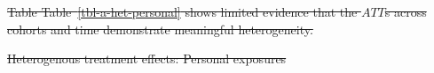 \documentclass[
  letterpaper,
  DIV=11,
  numbers=noendperiod]{scrartcl}
\makeatletter
\renewenvironment{table}%
   {\renewcommand\familydefault\sfdefault
    \@float{table}}
   {\end@float}
\providecommand{\DIFdeltex}[1]{{\protect\color{red}\sout{#1}}}                      %
\providecommand{\DIFdelFL}[1]{\DIFdel{#1}} %
\providecommand{\DIFdel}[1]{\texorpdfstring{\DIFdeltex{#1}}{}} %
\makeatother
\begin{document}



\DIFdel{Table Table~\ref{tbl-a-het-personal} shows limited evidence that the
\(ATT\)s across cohorts and time demonstrate meaningful heterogeneity.
}%

{%
\DIFdelFL{Heterogenous treatment effects: Personal exposures }}%
\end{document}

